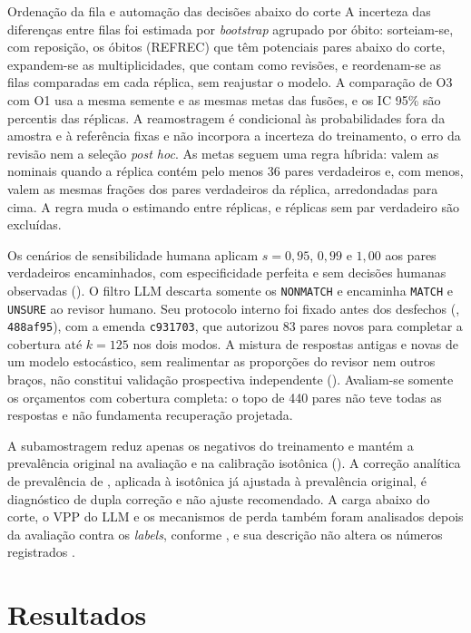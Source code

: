 \begin{chapter}{Ordenação da fila e automação das decisões abaixo do corte}
A incerteza das diferenças entre filas foi estimada por \textit{bootstrap} agrupado por óbito: sorteiam-se, com reposição, os óbitos (REFREC) que têm potenciais pares abaixo do corte, expandem-se as multiplicidades, que contam como revisões, e reordenam-se as filas comparadas em cada réplica, sem reajustar o modelo. A comparação de O3 com O1 usa a mesma semente e as mesmas metas das fusões, e os IC 95\% são percentis das réplicas. A reamostragem é condicional às probabilidades fora da amostra e à referência fixas e não incorpora a incerteza do treinamento, o erro da revisão nem a seleção \textit{post hoc}. As metas seguem uma regra híbrida: valem as nominais quando a réplica contém pelo menos 36 pares verdadeiros e, com menos, valem as mesmas frações dos pares verdadeiros da réplica, arredondadas para cima. A regra muda o estimando entre réplicas, e réplicas sem par verdadeiro são excluídas.

Os cenários de sensibilidade humana aplicam $s=0{,}95$, $0{,}99$ e $1{,}00$ aos pares verdadeiros encaminhados, com especificidade perfeita e sem decisões humanas observadas (). O filtro LLM descarta somente os \texttt{NONMATCH} e encaminha \texttt{MATCH} e \texttt{UNSURE} ao revisor humano. Seu protocolo interno foi fixado antes dos desfechos (, \texttt{488af95}), com a emenda \texttt{c931703}, que autorizou 83 pares novos para completar a cobertura até $k=125$ nos dois modos. A mistura de respostas antigas e novas de um modelo estocástico, sem realimentar as proporções do revisor nem outros braços, não constitui validação prospectiva independente (). Avaliam-se somente os orçamentos com cobertura completa: o topo de 440 pares não teve todas as respostas e não fundamenta recuperação projetada.

A subamostragem reduz apenas os negativos do treinamento e mantém a prevalência original na avaliação e na calibração isotônica (). A correção analítica de prevalência de , aplicada à isotônica já ajustada à prevalência original, é diagnóstico de dupla correção e não ajuste recomendado. A carga abaixo do corte, o VPP do LLM e os mecanismos de perda também foram analisados depois da avaliação contra os \textit{labels}, conforme , e sua descrição não altera os números registrados \cite{Jardim2026phdrepo}.
\section{Resultados}\label{sec:e4-resultados}


\end{chapter}

